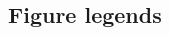 \documentclass[12pt]{article}
\begin{document}
\begin{spacing}{2.0}



 
 

\clearpage

\section*{Figure legends}
    


\end{spacing}
\end{document}
